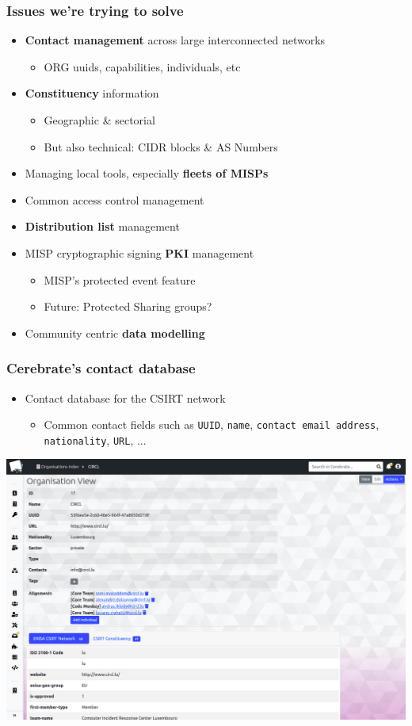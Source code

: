 \begin{frame}
\frametitle{Issues we're trying to solve}
    \begin{itemize}
        \item {\bf Contact management} across large interconnected networks
        \begin{itemize}
            \item ORG uuids, capabilities, individuals, etc
        \end{itemize}
        \item {\bf Constituency} information
         \begin{itemize}
            \item Geographic \& sectorial
            \item But also technical: CIDR blocks \& AS Numbers
        \end{itemize}
	\item Managing local tools, especially {\bf fleets of MISPs}
	\item Common access control management
	\item {\bf Distribution list} management
	\item MISP cryptographic signing {\bf PKI} management
	 \begin{itemize}
            \item MISP's protected event feature
            \item Future: Protected Sharing groups? 
        \end{itemize}
        \item Community centric {\bf data modelling}
    \end{itemize}
\end{frame}

\begin{frame}
\frametitle{Cerebrate's contact database}
    \begin{itemize}
        \item Contact database for the CSIRT network
        \begin{itemize}
            \item Common contact fields such as \texttt{UUID}, \texttt{name}, \texttt{contact email address}, \texttt{nationality}, \texttt{URL}, ...
        \end{itemize}
    \end{itemize}
    \begin{center}
        \includegraphics[width=0.8\linewidth]{pictures/contact-database-1.png}
    \end{center}
\end{frame}

